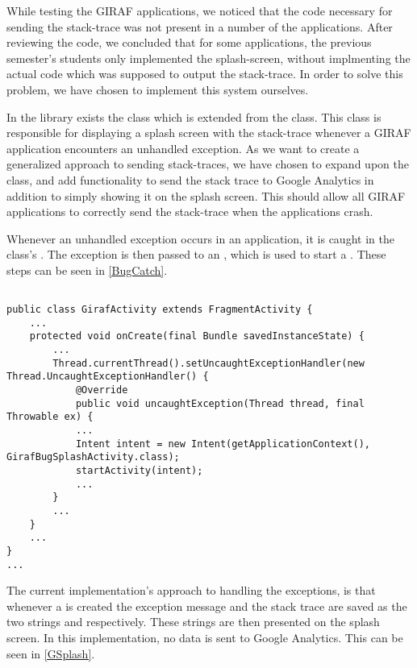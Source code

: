 
While testing the GIRAF applications, we noticed that the code necessary for
sending the stack-trace was not present in a number of the applications. After
reviewing the code, we concluded that for some applications, the previous
semester's students only implemented the splash-screen, without implmenting the
actual code which was supposed to output the stack-trace. In order to solve this
problem, we have chosen to implement this system ourselves.\nl

In the library  exists the class
 which is extended from the 
class. This class is responsible for displaying a splash screen with the
stack-trace whenever a GIRAF application encounters an unhandled exception. As
we want to create a generalized approach to sending stack-traces, we have chosen
to expand upon the  class, and add functionality
to send the stack trace to Google Analytics in addition to simply showing it on
the splash screen. This should allow all GIRAF applications to correctly send
the stack-trace when the applications crash. \nl

Whenever an unhandled exception occurs in an application, it is caught in the
 class's . The exception is
then passed to an , which is used to start a
. These steps can be seen in
\autoref{BugCatch}.\nl


\begin{minipage}[H]{\linewidth}
\begin{lstlisting}[caption = Catching exceptions and starting creating a \textc{GirafBugSplashActivity}, label = BugCatch]

public class GirafActivity extends FragmentActivity {
	...
    protected void onCreate(final Bundle savedInstanceState) {
    	...
    	Thread.currentThread().setUncaughtExceptionHandler(new Thread.UncaughtExceptionHandler() {
            @Override
            public void uncaughtException(Thread thread, final Throwable ex) {
            ...
            Intent intent = new Intent(getApplicationContext(), GirafBugSplashActivity.class);
			startActivity(intent);
			...
		}
		...
	}
	...
}
...			
\end{lstlisting}
\end{minipage}

The current implementation's approach to handling the exceptions, is
that whenever a  is created the exception message
and the stack trace are saved as the two strings  and
 respectively. These strings are then presented on the splash
screen. In this implementation, no data is sent to Google Analytics. This can be
seen in \autoref{GSplash}.\nl

